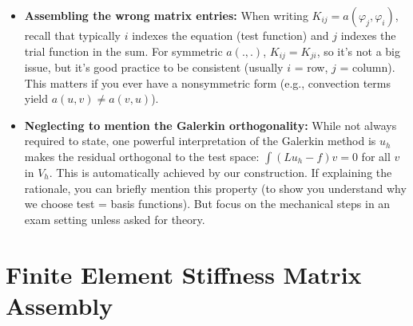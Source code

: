 \documentclass[a4paper,11pt]{report}
\begin{document}
\begin{itemize}
    \item \textbf{Assembling the wrong matrix entries:} When writing $K_{ij} = a(\varphi_j,\varphi_i)$, recall that typically $i$ indexes the equation (test function) and $j$ indexes the trial function in the sum. For symmetric $a(.,.)$, $K_{ij} = K_{ji}$, so it's not a big issue, but it's good practice to be consistent (usually $i$ = row, $j$ = column). This matters if you ever have a nonsymmetric form (e.g., convection terms yield $a(u,v)\neq a(v,u)$).

    \item \textbf{Neglecting to mention the Galerkin orthogonality:} While not always required to state, one powerful interpretation of the Galerkin method is $u_h$ makes the residual orthogonal to the test space: $\int (Lu_h - f)v = 0$ for all $v$ in $V_h$. This is automatically achieved by our construction. If explaining the rationale, you can briefly mention this property (to show you understand why we choose test = basis functions). But focus on the mechanical steps in an exam setting unless asked for theory.
\end{itemize}

\section{Finite Element Stiffness Matrix Assembly}
\end{document}
